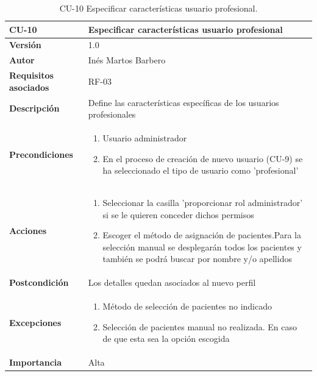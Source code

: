 \begin{table}[p]
	\centering
	\begin{tabularx}{\linewidth}{ p{} p{} }
		\toprule
		\textbf{CU-10}    & \textbf{Especificar características usuario profesional}\\
		\toprule
		\textbf{Versión}              & 1.0    \\
		\textbf{Autor}                & Inés Martos Barbero \\
		\textbf{Requisitos asociados} & RF-03 \\
		\textbf{Descripción}          & Define las características específicas de los usuarios profesionales \\
		\textbf{Precondiciones}         & 
            \begin{enumerate}
    			\def\labelenumi{\arabic{enumi}.}
    			\tightlist
    			\item Usuario administrador
    			\item En el proceso de creación de nuevo usuario (CU-9) se ha seleccionado el tipo de usuario como 'profesional'
    		\end{enumerate}\\
		\textbf{Acciones}             &
    		\begin{enumerate}
    			\def\labelenumi{\arabic{enumi}.}
    			\tightlist
    			\item Seleccionar la casilla 'proporcionar rol administrador' si se le quieren conceder dichos permisos
    			\item Escoger el método de asignación de pacientes.Para la selección manual se desplegarán todos los pacientes y también se podrá buscar por nombre y/o apellidos
    		\end{enumerate}\\
		\textbf{Postcondición}        & Los detalles quedan asociados al nuevo perfil \\
		\textbf{Excepciones}          & 
            \begin{enumerate}
    			\def\labelenumi{\arabic{enumi}.}
    			\tightlist
    			\item Método de selección de pacientes no indicado
    			\item Selección de pacientes manual no realizada. En caso de que esta sea la opción escogida
    		\end{enumerate}\\
		\textbf{Importancia}          & Alta\\
		\bottomrule
	\end{tabularx}
	\caption{CU-10 Especificar características usuario profesional.}
\end{table}


